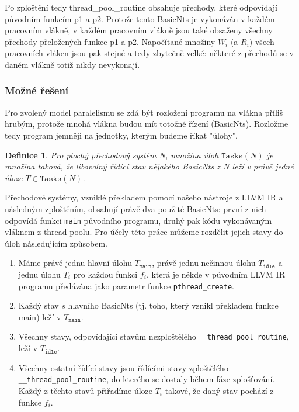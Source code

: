 \documentclass[10pt,a4paper,notitlepage]{report}
\newtheorem{definition}{Definice}
\begin{document}
Po zploštění tedy thread\_pool\_routine obsahuje přechody, které odpovídají původním funkcím p1 a p2. Protože tento BasicNts je vykonáván v každém pracovním vlákně, v každém pracovním vlákně jsou také obsaženy všechny přechody přeložených funkce p1 a p2. Napočítané množiny $W_i$ (a $R_i$) všech pracovních vláken jsou pak stejné a tedy zbytečně velké: některé z přechodů se v daném vlákně totiž nikdy nevykonají.

\subsubsection{Možné řešení}
Pro zvolený model paralelismu se zdá být rozložení programu na vlákna příliš hrubým, protože mnohá vlákna budou mít totožné řízení (BasicNts). Rozložme tedy program jemněji na jednotky, kterým budeme říkat "úlohy".

\begin{definition}
Pro plochý přechodový systém N, množina úloh $\texttt{Tasks}(N)$ je množina taková, že libovolný řídící stav nějakého BasicNts z N leží v právě jedné úloze $T \in \texttt{Tasks}(N)$.
\end{definition}

Přechodové systémy, vzniklé překladem pomocí našeho nástroje z LLVM IR a následným zploštěním, obsahují právě dva použité BasicNts: první z nich odpovídá funkci \texttt{main} původního programu, druhý pak kódu vykonávaným vláknem z thread poolu. Pro účely této práce můžeme rozdělit jejich stavy do úloh následujícím způsobem.

\begin{enumerate}
\item Máme právě jednu hlavní úlohu $T_{\texttt{main}}$, právě jednu nečinnou úlohu $T_{\texttt{idle}}$ a jednu úlohu $T_i$ pro každou funkci $f_i$, která je někde v původním LLVM IR programu předávána jako parametr funkce \texttt{pthread\_create}.
\item Každý stav $s$ hlavního BasicNts (tj. toho, který vznikl překladem funkce main) leží v $T_{\texttt{main}}$.
\item Všechny stavy, odpovídající stavům nezploštělého \texttt{\_\_thread\_pool\_routine}, leží v $T_{\texttt{idle}}$.
\item Všechny ostatní řídící stavy jsou řídícími stavy zploštělého \texttt{\_\_thread\_pool\_routine}, do kterého se dostaly během fáze zplošťování. Každý z těchto stavů přiřadíme úloze $T_i$ takové, že daný stav pochází z funkce $f_i$.
\end{enumerate}
\end{document}
